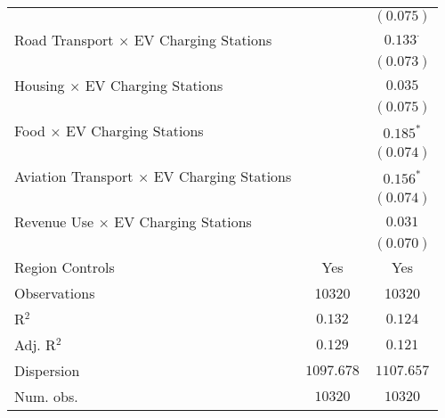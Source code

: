 \begin{center}
\begin{tiny}
\begin{longtable}{l@{} c@{} c@{}}
                                                          &                  & $(0.075)$        \\
\quad Road Transport $\times$ EV Charging Stations        &                  & $0.133^{\cdot}$  \\
                                                          &                  & $(0.073)$        \\
\quad Housing $\times$ EV Charging Stations               &                  & $0.035$          \\
                                                          &                  & $(0.075)$        \\
\quad Food $\times$ EV Charging Stations                  &                  & $0.185^{*}$      \\
                                                          &                  & $(0.074)$        \\
\quad Aviation Transport $\times$ EV Charging Stations    &                  & $0.156^{*}$      \\
                                                          &                  & $(0.074)$        \\
\quad Revenue Use $\times$ EV Charging Stations           &                  & $0.031$          \\
                                                          &                  & $(0.070)$        \\
\hline
Region Controls                                           & Yes              & Yes              \\
Observations                                              & 10320            & 10320            \\
R$^2$                                                     & $0.132$          & $0.124$          \\
Adj. R$^2$                                                & $0.129$          & $0.121$          \\
Dispersion                                                & $1097.678$       & $1107.657$       \\
Num. obs.                                                 & $10320$          & $10320$          \\
\end{longtable}
\end{tiny}
\end{center}
